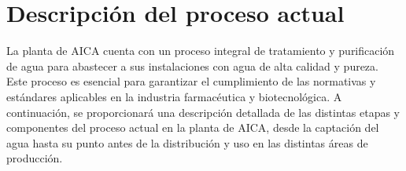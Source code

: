 \section{Descripción del proceso actual}

La planta de AICA cuenta con un proceso integral de tratamiento y purificación de agua para abastecer
a sus instalaciones con agua de alta calidad y pureza. Este proceso es esencial para garantizar
el cumplimiento de las normativas y estándares aplicables en la industria farmacéutica y biotecnológica.
A continuación, se proporcionará una descripción detallada de las distintas etapas y componentes del
proceso actual en la planta de AICA, desde la captación del agua hasta su punto antes de la distribución y uso en las distintas áreas de producción.


